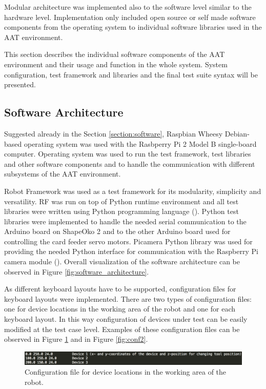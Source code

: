Modular architecture was implemented also to the software level similar to the hardware level. Implementation only included open source or self made software components from the operating system to individual software libraries used in the AAT environment.

This section describes the individual software components of the AAT environment and their usage and function in the whole system. System configuration, test framework and libraries and the final test suite syntax will be presented.

\subsection{Software Architecture}
\label{subsection:Software architecture}

Suggested already in the Section \ref{section:software}, Raspbian Wheesy Debian-based operating system was used with the Rasbperry Pi 2 Model B single-board computer. Operating system was used to run the test framework, test libraries and other software components and to handle the communication with different subsystems of the AAT environment.

Robot Framework was used as a test framework for its modularity, simplicity and versatility. RF was run on top of Python runtime environment and all test libraries were written using Python programming language (\emph{\cite{python}}). Python test libraries were implemented to handle the needed serial communication to the Arduino board on ShapeOko 2 and to the other Arduino board used for controlling the card feeder servo motors. Picamera Python library was used for providing the needed Python interface for communication with the Raspberry Pi camera module (\emph{\cite{picamera}}). Overall visualization of the software architecture can be observed in Figure \ref{fig:software_architecture}.

As different keyboard layouts have to be supported, configuration files for keyboard layouts were implemented. There are two types of configuration files: one for device locations in the working area of the robot and one for each keyboard layout. In this way configuration of devices under test can be easily modified at the test case level. Examples of these configuration files can be observed in Figure \ref{fig:conf1} and in Figure \ref{fig:conf2}.

\begin{figure}[ht]
  \begin{center}
    \includegraphics[width=\textwidth]{images/conf1.png}
    \caption{Configuration file for device locations in the working area of the robot.}
    \label{fig:conf1}
  \end{center}
\end{figure}
\FloatBarrier

